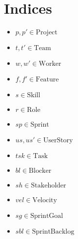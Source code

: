 \documentclass[11pt]{article}
\begin{document}
\section{Indices}
\begin{itemize}
    \item $p, p' \in \text{Project}$
    \item $t, t' \in \text{Team}$
    \item $w, w' \in \text{Worker}$
    \item $f, f' \in \text{Feature}$
    \item $s \in \text{Skill}$
    \item $r \in \text{Role}$
    \item $sp \in \text{Sprint}$
    \item $us, us' \in \text{UserStory}$
    \item $tsk \in \text{Task}$
    \item $bl \in \text{Blocker}$
    \item $sh \in \text{Stakeholder}$
    \item $vel \in \text{Velocity}$
    \item $sg \in \text{SprintGoal}$
    \item $sbl \in \text{SprintBacklog}$
\end{itemize}
\end{document}
